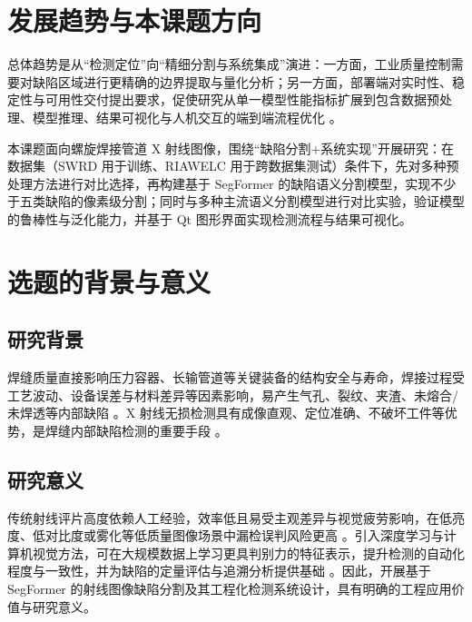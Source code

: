 \documentclass{cjlu_proposal}
\begin{document}
\section{发展趋势与本课题方向}
总体趋势是从“检测定位”向“精细分割与系统集成”演进：一方面，工业质量控制需要对缺陷区域进行更精确的边界提取与量化分析；另一方面，部署端对实时性、稳定性与可用性交付提出要求，促使研究从单一模型性能指标扩展到包含数据预处理、模型推理、结果可视化与人机交互的端到端流程优化 \cite{Zuo2025_EndToEndWeldingDefect, Yu2025_IndustrialDefectRecognition}。

本课题面向螺旋焊接管道 X 射线图像，围绕“缺陷分割+系统实现”开展研究：在数据集（SWRD 用于训练、RIAWELC 用于跨数据集测试）条件下，先对多种预处理方法进行对比选择，再构建基于 SegFormer 的缺陷语义分割模型，实现不少于五类缺陷的像素级分割；同时与多种主流语义分割模型进行对比实验，验证模型的鲁棒性与泛化能力，并基于 Qt 图形界面实现检测流程与结果可视化。

\section{选题的背景与意义}
\subsection{研究背景}
焊缝质量直接影响压力容器、长输管道等关键装备的结构安全与寿命，焊接过程受工艺波动、设备误差与材料差异等因素影响，易产生气孔、裂纹、夹渣、未熔合/未焊透等内部缺陷 \cite{Hu2020_DeepLearningWeldDefect, Dai2025_CCBFERCNN}。X 射线无损检测具有成像直观、定位准确、不破坏工件等优势，是焊缝内部缺陷检测的重要手段 \cite{Mery2015_GDXrayDataset, Yu2025_IndustrialDefectRecognition}。

\subsection{研究意义}
传统射线评片高度依赖人工经验，效率低且易受主观差异与视觉疲劳影响，在低亮度、低对比度或雾化等低质量图像场景中漏检误判风险更高 \cite{Hou2020_ReviewWeldDefectDetection, Ajmi2023_FasterRCNNWeldDefects}。引入深度学习与计算机视觉方法，可在大规模数据上学习更具判别力的特征表示，提升检测的自动化程度与一致性，并为缺陷的定量评估与追溯分析提供基础 \cite{He2015_DeepResidualLearning, Yu2025_IndustrialDefectRecognition}。因此，开展基于 SegFormer 的射线图像缺陷分割及其工程化检测系统设计，具有明确的工程应用价值与研究意义。
\end{document}
